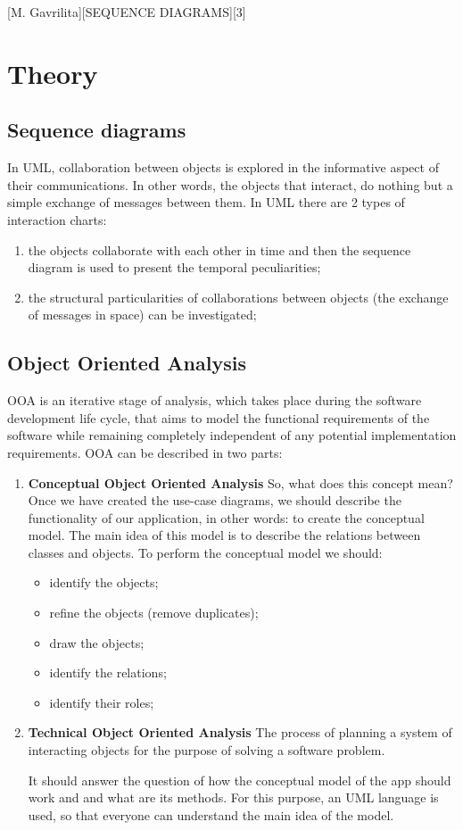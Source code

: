 \documentclass{article}
\begin{document}
	[M. Gavrilita][SEQUENCE DIAGRAMS][3]

	\section{Theory}
		\subsection{Sequence diagrams}
			In UML, collaboration between objects is explored in the informative aspect of their communications. In other words, the objects that interact, do nothing but a simple exchange of messages between them. In UML there are 2 types of interaction charts:
			\begin{enumerate}
				\item the objects collaborate with each other in time and then  the sequence diagram is used to present the temporal peculiarities;

				\item the structural particularities of collaborations between objects (the exchange of messages in space) can be investigated;
			\end{enumerate}

		\subsection{Object Oriented Analysis}
			OOA is an iterative stage of analysis, which takes place during the software development life cycle, that aims to model the functional requirements of the software while remaining completely independent of any potential implementation requirements. OOA can be described in two parts:
			\begin{enumerate}
				\item \textbf{Conceptual Object Oriented Analysis}
				So, what does this concept mean?
				Once we have created the use-case diagrams, we should describe the functionality of our application, in other words: to create the conceptual model. The main idea of this model is to describe the relations between classes and objects. To perform the conceptual model we should:
				\begin{itemize}
					\item identify the objects;
					\item refine the objects (remove duplicates);
					\item draw the objects;
					\item identify the relations;
					\item identify their roles;
				\end{itemize}

				\item \textbf{Technical Object Oriented Analysis}
				The process of planning a system of interacting objects for the purpose of solving a software problem.

				It should answer the question of how the conceptual model of the app should work and and what are its methods. For this purpose, an UML language is used, so that everyone can understand the main idea of the model.
			\end{enumerate}
\end{document}
